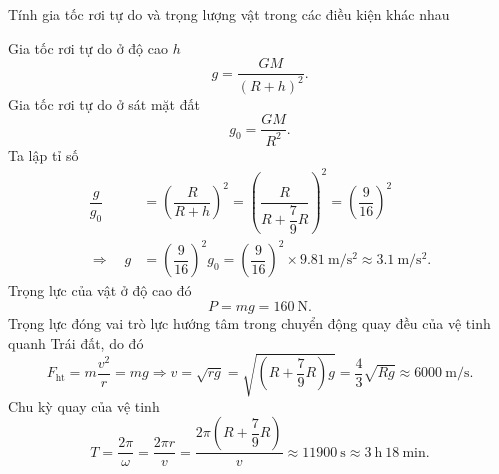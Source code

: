 \begin{dang}{Tính gia tốc rơi tự do và  trọng lượng vật trong các điều kiện khác nhau}
{		Gia tốc rơi tự do ở độ cao $h$ 
		\begin{equation*}
			g = \dfrac{GM}{(R+h)^2}.
		\end{equation*}
		Gia tốc rơi tự do ở sát mặt đất 
		\begin{equation*}
			g_0 = \dfrac{GM}{R^2}.
		\end{equation*}
		Ta lập tỉ số  
		\begin{align*}
			\dfrac{g}{g_0}&= \left(\dfrac{R}{R+h}\right)^2 =\left(\dfrac{R}{R+\dfrac{7}{9}R}\right)^2=\left(\dfrac{9}{16}\right)^{2}\\
			\Rightarrow\quad g&= \left(\dfrac{9}{16}\right)^2g_0=\left(\dfrac{9}{16}\right)^2\times\SI{9.81}{\meter/\second^{2}}\approx \SI{3.1}{\meter/\second^{2}}.
		\end{align*}
		Trọng lực  của vật ở độ cao đó
			\begin{equation*}
				P = mg= 160\ \text{N}.
			\end{equation*}
		Trọng lực đóng vai trò lực hướng tâm trong chuyển động quay đều của vệ tinh quanh Trái đất, do đó 
			\begin{equation*}
				F_{\text{ht}} =m\dfrac{v^2}{r} = mg \Rightarrow v=\sqrt{rg}=\sqrt{\left(R+\dfrac{7}{9}R\right) g} = \dfrac{4}{3} \sqrt{Rg} \approx \SI{6000}{\meter/\second}.
			\end{equation*}
		Chu kỳ quay của vệ tinh
			\begin{equation*}
				T =\dfrac{2\pi}{\omega}= \dfrac{2\pi r}{v} = \dfrac{2\pi \left(R+\dfrac{7}{9}R\right)}{v}\approx\SI{11900}{\second}\approx\SI{3}{\hour}\ \SI{18}{\minute}. 
			\end{equation*}
		
	}
\end{dang}
